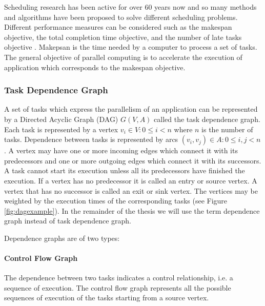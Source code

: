 Scheduling research has been active for over 60 years now and so many methods and algorithms have been proposed to solve different scheduling problems. Different performance measures can be considered such as the makespan objective, the total completion time objective, and the number of late tasks objective \cite{leung:2004}. Makepsan is the time needed by a computer to process a set of tasks. The general objective of parallel computing is to accelerate the execution of application which corresponds to the makespan objective.

\subsubsection{Task Dependence Graph}

A set of tasks which express the parallelism of an application can be represented by a Directed Acyclic Graph (DAG) $G(V,A)$ called the task dependence graph. Each task is represented by a vertex $v_i \in V: 0 \leq i < n$ where $n$ is the number of tasks. Dependence between tasks is represented by arcs $(v_i, v_j) \in A: 0 \leq i,j < n$. A vertex may have one or more incoming edges which connect it with its predecessors and one or more outgoing edges which connect it with its successors. A task cannot start its execution unless all its predecessors have finished the execution. If a vertex has no predecessor it is called an entry or source vertex. A vertex that has no successor is called an exit or sink vertex. The vertices may be weighted by the execution times of the corresponding tasks (see Figure \ref{fig:dagexample}). In the remainder of the thesis we will use the term dependence graph instead of task dependence graph.


Dependence graphs are of two types:

\paragraph{Control Flow Graph} 

The dependence between two tasks indicates a control relationship, i.e. a sequence of execution. The control flow graph represents all the possible sequences of execution of the tasks starting from a source vertex.


